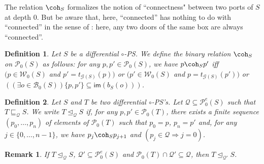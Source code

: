 \documentclass{article}
\newcommand{\target}[1]{t_{#1}}
\theoremstyle{plain}
\newtheorem{definition}{Definition}
\newtheorem{rem}{Remark}
\newcommand{\groundof}[1]{\mathcal{G}(#1)}
\def\restriction#1#2{\mathchoice
              {\setbox1\hbox{${\displaystyle #1}_{\scriptstyle #2}$}
              \restrictionaux{#1}{#2}}
              {\setbox1\hbox{${\textstyle #1}_{\scriptstyle #2}$}
              \restrictionaux{#1}{#2}}
              {\setbox1\hbox{${\scriptstyle #1}_{\scriptscriptstyle #2}$}
              \restrictionaux{#1}{#2}}
              {\setbox1\hbox{${\scriptscriptstyle #1}_{\scriptscriptstyle #2}$}
              \restrictionaux{#1}{#2}}}
\def\restrictionaux#1#2{{#1\,\smash{\vrule height .8\ht1 depth .85\dp1}}_{\,#2}}
\newcommand{\im}[1]{\textsf{im}(#1)}
\newcommand{\contr}{\wn}
\newcommand{\portsatzero}[1]{\mathcal{P}_0(#1)}
\newcommand{\wiresatzero}[1]{\mathcal{W}_0(#1)}
\newcommand{\ports}[1]{\mathcal{P}(#1)}
\newcommand{\conclusions}[1]{\mathcal{P}^{\textsf{f}}(#1)}
\newcommand{\portsoftype}[2]{\mathcal{P}^{#1}(#2)}
\newcommand{\exponentialportsatzero}[1]{\mathcal{P}_0^\textit{e}(#1)}
\newcommand{\conclusionscirc}[1]{\mathcal{P}_\circ^{\textsf{f}}(#1)}
\newcommand{\boxesatzero}[1]{\mathcal{B}_{0}(#1)}
\begin{document}
\begin{comment}
\begin{proof}
By Fact~\ref{fact: sqsubseteq}, we already know that there exists a differential ground-structure $\mathcal{G}$ such that $\ports{\mathcal{G}} = \mathcal{P}$ and $\mathcal{G} \sqsubseteq_{\mathcal{P'}} \groundof{S}$. We set $R = (\mathcal{G}, \boxesatzero{S} \cap \mathcal{P}, \restriction{B_S}{\boxesatzero{S} \cap \mathcal{P}}, b')$, where $b'$ is a function that associates with every $o \in \boxesatzero{S} \cap \mathcal{P}$ the function: $\begin{array}{rcl} b'(o) : \conclusions{B_S(o)} & \to & \{ o \} \cup \portsoftype{\contr}{\mathcal{G}} \cup \conclusionscirc{\mathcal{G}}\\ p & \mapsto & b(o)(p) \end{array}$
\end{proof}
\end{comment}




The relation $\coh_S$ formalizes the notion of ``connectness" between two ports of $S$ at depth $0$. But be aware that, here, ``connected'' has nothing to do with ``connected'' in the sense of \cite{LPSinjectivity}: here, any two doors of the same box are always ``connected''.

\begin{definition}
Let $S$ be a differential $\circ$-PS. We define the binary relation $\coh_S$ on $\portsatzero{S}$ as follows: for any $p, p' \in \portsatzero{S}$, we have $p \coh_S p'$ iff $(p \in \wiresatzero{S}$ and $p' = \target{\groundof{S}}(p))$ or $(p' \in \wiresatzero{S}$ and $p = \target{\groundof{S}}(p'))$ or $((\exists o \in \boxesatzero{S}) \{ p, p' \} \subseteq \im{b_S(o)})$.
\end{definition}

\begin{definition}\label{defin: connected substructure}
Let $S$ and $T$ be two differential $\circ$-PS's. Let $\mathcal{Q} \subseteq \exponentialportsatzero{S}$ such that $T \sqsubseteq_{\mathcal{Q}} S$. We write $T \trianglelefteq_\mathcal{Q} S$ if, for any $p, p' \in \portsatzero{T}$, there exists a finite sequence $(p_0, \ldots, p_n)$ of elements of $\portsatzero{T}$ such that $p_0 = p$, $p_n = p'$ and, for any $j \in \{ 0, \ldots, n-1 \}$, we have $p_j \coh_S p_{j+1}$ and $(p_j \in \mathcal{Q} \Rightarrow j = 0)$.
\end{definition}

\begin{rem}
If $T \trianglelefteq_{\mathcal{Q}} S$, $\mathcal{Q'} \subseteq \exponentialportsatzero{S}$ and $\portsatzero{T} \cap \mathcal{Q'} \subseteq \mathcal{Q}$, then $T \trianglelefteq_{\mathcal{Q'}} S$.
\end{rem}
\end{document}
